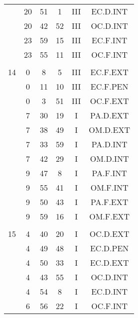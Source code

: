 \documentclass[12pt, a4paper]{article}
\begin{document}
\begin{multicols}{3}
{\begin{tabular}{c c c c c c}
	 	 	 	 & 20 & 51 & 1 & III & EC.D.INT\\%
	 	 	 	 & 20 & 42 & 52 & III & OC.D.INT\\%
	 	 	 	 & 23 & 59 & 15 & III & EC.F.INT\\%
	 	 	 	 & 23 & 55 & 11 & III & OC.F.INT\\%
	 	 	 	 & & & & & \\%
	 	 	 	14 & 0 & 8 & 5 & III & EC.F.EXT\\%
	 	 	 	 & 0 & 11 & 10 & III & EC.F.PEN\\%
	 	 	 	 & 0 & 3 & 51 & III & OC.F.EXT\\%
	 	 	 	 & 7 & 30 & 19 & I & PA.D.EXT\\%
	 	 	 	 & 7 & 38 & 49 & I & OM.D.EXT\\%
	 	 	 	 & 7 & 33 & 59 & I & PA.D.INT\\%
	 	 	 	 & 7 & 42 & 29 & I & OM.D.INT\\%
	 	 	 	 & 9 & 47 & 8 & I & PA.F.INT\\%
	 	 	 	 & 9 & 55 & 41 & I & OM.F.INT\\%
	 	 	 	 & 9 & 50 & 43 & I & PA.F.EXT\\%
	 	 	 	 & 9 & 59 & 16 & I & OM.F.EXT\\%
	 	 	 	 & & & & & \\%
	 	 	 	15 & 4 & 40 & 20 & I & OC.D.EXT\\%
	 	 	 	 & 4 & 49 & 48 & I & EC.D.PEN\\%
	 	 	 	 & 4 & 50 & 33 & I & EC.D.EXT\\%
	 	 	 	 & 4 & 43 & 55 & I & OC.D.INT\\%
	 	 	 	 & 4 & 54 & 8 & I & EC.D.INT\\%
	 	 	 	 & 6 & 56 & 22 & I & OC.F.INT\\%

\end{tabular}}
\end{multicols}
\end{document}
